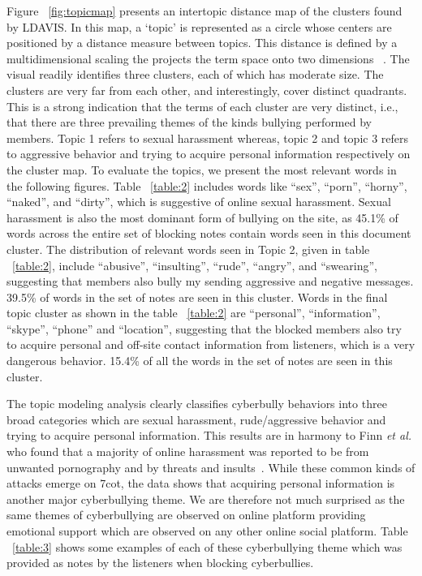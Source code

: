Figure ~\ref{fig:topicmap} presents an intertopic distance map of the clusters found by LDAVIS. In this map, a ‘topic’ is represented as a circle whose centers are positioned by a distance measure between topics. This distance is defined by a multidimensional scaling the projects the term space onto two dimensions ~\cite{chuang2012interpretation}. The visual readily identifies three clusters, each of which has moderate size. The clusters are very far from each other, and interestingly, cover distinct quadrants. This is a strong indication that the terms of each cluster are very distinct, i.e., that there are three prevailing themes of the kinds bullying performed by members. Topic 1 refers to sexual harassment whereas, topic 2 and topic 3 refers to aggressive behavior and trying to acquire personal information respectively on the cluster map. To evaluate the topics, we present the most relevant words in the following figures. Table ~\ref{table:2} includes words like “sex”, “porn”, “horny”, “naked”, and “dirty”, which is suggestive of online sexual harassment. Sexual harassment is also the most dominant form of bullying on the site, as 45.1\% of words across the entire set of blocking notes contain words seen in this document cluster. The distribution of relevant words seen in Topic 2, given in table ~\ref{table:2}, include “abusive”, “insulting”, “rude”, “angry”, and “swearing”, suggesting that members also bully my sending aggressive and negative messages. 39.5\% of words in the set of notes are seen in this cluster. Words in the final topic cluster as shown in the table ~\ref{table:2} are “personal”, “information”, “skype”, “phone” and “location”, suggesting that the blocked members also try to acquire personal and off-site contact information from listeners, which is a very dangerous behavior. 15.4\% of all the words in the set of notes are seen in this cluster. 

The topic modeling analysis clearly classifies cyberbully behaviors into three broad categories which are sexual harassment, rude/aggressive behavior and trying to acquire personal information. This results are in harmony
to Finn {\em et al.} who found that a majority of online harassment was reported to be from unwanted pornography and by threats and insults~\cite{finn2004survey}. While these common kinds of attacks emerge on 7cot, the data
shows that acquiring personal information is another major cyberbullying theme. We are therefore not much surprised as the same themes of cyberbullying are observed on online platform providing emotional support which are observed on any other online social platform. Table ~\ref{table:3} shows some examples of each of these cyberbullying theme which was provided as notes by the listeners when blocking cyberbullies.

